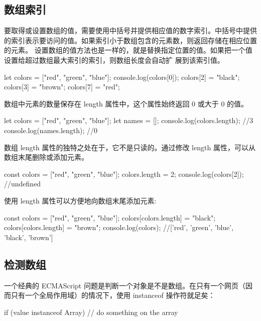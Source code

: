 \subsection{数组索引}
要取得或设置数组的值，需要使用中括号并提供相应值的数字索引。中括号中提供的索引表示要访问的值。如果索引小于数组包含的元素数，则返回存储在相应位置的元素。 设置数组的值方法也是一样的，就是替换指定位置的值。如果把一个值设置给超过数组最大索引的索引，则数组长度会自动扩
展到该索引值。
\begin{js}
let colors = ["red", "green", "blue"];
console.log(colors[0]);
colors[2] = "black";
colors[3] = "brown";
colors[7] = "red";
\end{js}

数组中元素的数量保存在 length 属性中，这个属性始终返回 0 或大于 0 的值。
\begin{js}
let colors = ["red", "green", "blue"];
let names = [];
console.log(colors.length); //3
console.log(names.length); //0
\end{js}

数组 length 属性的独特之处在于，它不是只读的。通过修改 length 属性，可以从数组末尾删除或添加元素。

\begin{js}
const colors = ["red", "green", "blue"];
colors.length = 2;
console.log(colors[2]); //undefined
\end{js}

使用 length 属性可以方便地向数组末尾添加元素:
\begin{js}
const colors = ["red", "green", "blue"];
colors[colors.length] = "black";
colors[colors.length] = "brown";
console.log(colors); //['red', 'green', 'blue', 'black', 'brown']
\end{js}

\subsection{检测数组}
一个经典的 ECMAScript 问题是判断一个对象是不是数组。在只有一个网页（因而只有一个全局作用域）的情况下，使用 instanceof 操作符就足矣：
\begin{js}
if (value instanceof Array) {
    // do something on the array
    }
\end{js}

